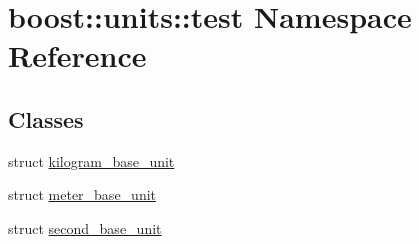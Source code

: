 \hypertarget{namespaceboost_1_1units_1_1test}{}\section{boost\+:\+:units\+:\+:test Namespace Reference}
\label{namespaceboost_1_1units_1_1test}
\subsection*{Classes}
\begin{DoxyCompactItemize}
\item 
struct \hyperlink{structboost_1_1units_1_1test_1_1kilogram__base__unit}{kilogram\+\_\+base\+\_\+unit}
\item 
struct \hyperlink{structboost_1_1units_1_1test_1_1meter__base__unit}{meter\+\_\+base\+\_\+unit}
\item 
struct \hyperlink{structboost_1_1units_1_1test_1_1second__base__unit}{second\+\_\+base\+\_\+unit}
\end{DoxyCompactItemize}
